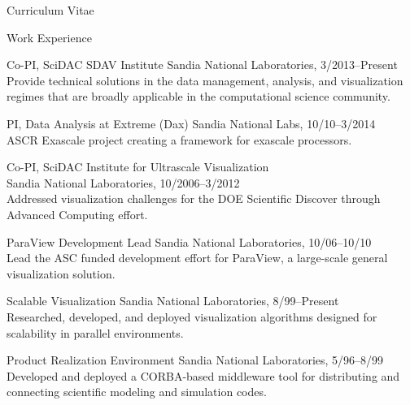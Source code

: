 \documentclass{article}
\begin{document}
\begin{cv}{Curriculum Vitae}
    \begin{cvlist}{Work Experience}
    \item[Co-PI, SciDAC SDAV Institute]\hfill Sandia National Laboratories, 3/2013--Present\\
      Provide technical solutions in the data management, analysis, and
      visualization regimes that are broadly applicable in the
      computational science community.
    \item[PI, Data Analysis at Extreme (Dax)]\hfill Sandia National Labs, 10/10--3/2014\\
      ASCR Exascale project creating a framework for exascale processors.
    \item[Co-PI, SciDAC Institute for Ultrascale Visualization]~\\\hfill Sandia National Laboratories, 10/2006--3/2012\\
      Addressed visualization challenges for the DOE Scientific Discover
      through Advanced Computing effort.
    \item[ParaView Development Lead]\hfill Sandia National Laboratories, 10/06--10/10\\
      Lead the ASC funded development effort for ParaView, a large-scale
      general visualization solution.
    \item[Scalable Visualization]\hfill Sandia National Laboratories, 8/99--Present \\
      Researched, developed, and deployed visualization algorithms designed
      for scalability in parallel environments.
    \item[Product Realization Environment]\hfill Sandia National Laboratories,
      5/96--8/99 \\
      Developed and deployed a CORBA-based middleware tool for distributing
      and connecting scientific modeling and simulation codes.
    \end{cvlist}


\end{cv}
\end{document}
